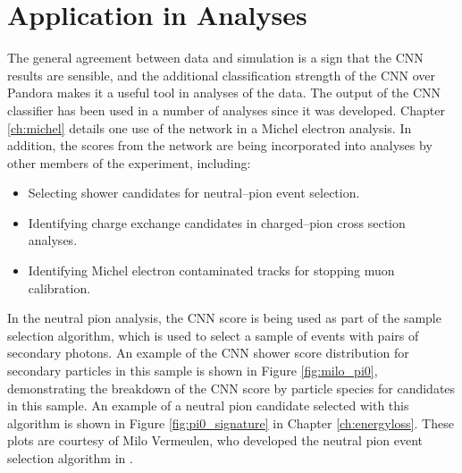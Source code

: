 \section{Application in \protodune{} Analyses} \label{cnn-appl}
The general agreement between data and simulation is a sign that the CNN results
are sensible, and the additional classification strength of the CNN over
Pandora makes it a useful tool in analyses of the \protodune{} data. The 
output of the CNN classifier has been used in a number of \protodune{} 
analyses since it was developed. Chapter \ref{ch:michel} details one use of 
the network in a Michel electron analysis. In addition, the scores from the 
network are being incorporated into analyses by other members of the 
\protodune{} experiment, including:
\begin{itemize}
	\item Selecting shower candidates for neutral--pion event selection\cite{pi_0}.
	\item Identifying charge exchange candidates in charged--pion cross section 
		analyses\cite{pion_exchange}.
	\item Identifying Michel electron contaminated tracks for stopping muon
		calibration\cite{fabio_muon}.
\end{itemize}

\medskip
In the neutral pion analysis, the CNN score is being used as part of the 
sample selection algorithm, which is used to select a sample of events with
pairs of secondary photons. An example of the CNN shower score distribution for
secondary particles in this sample is shown in Figure \ref{fig:milo_pi0}, 
demonstrating the breakdown of the CNN score by particle species for candidates
in this sample. An example of a neutral pion candidate selected with this
algorithm is shown in Figure \ref{fig:pi0_signature} in Chapter 
\ref{ch:energyloss}. These plots are courtesy of Milo Vermeulen, who 
developed the neutral pion event selection algorithm in \protodune{}\cite{pi_0}.

